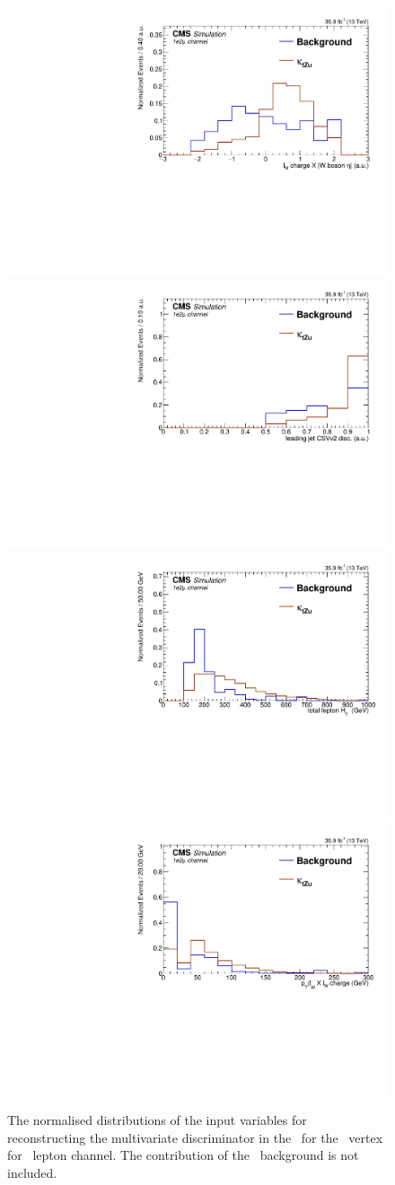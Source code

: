 \begin{figure}[htbp]
	\includegraphics[width=0.3\linewidth]{6_Search/Figures/BDTinputvars/Zut/singletop_MVA_charge_asym_uue_Normalized}
	\includegraphics[width=0.3\linewidth]{6_Search/Figures/BDTinputvars/Zut/singletop_MVA_bdiscCSVv2_jet_0_uue_Normalized}
	\includegraphics[width=0.3\linewidth]{6_Search/Figures/BDTinputvars/Zut/singletop_MVA_TotalHt_lep_uue_Normalized}
	\includegraphics[width=0.3\linewidth]{6_Search/Figures/BDTinputvars/Zut/singletop_MVA_ptWQ_uue_Normalized}
	\caption{The normalised distributions of the input variables for reconstructing the multivariate discriminator in the \STSR\ for the \Zut\ vertex for \emumu\ lepton channel. The contribution of the \NPL\ background is not included. }
	\label{fig:singletopZutnormalizeduue}
\end{figure}


